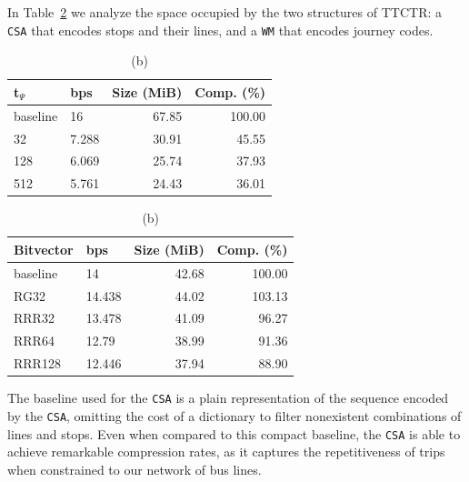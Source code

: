 \documentclass[runningheads]{llncs}
\newcommand{\ttctr}{TTCTR}
\begin{document}
In Table~\ref{tab:ttctr} we analyze the space occupied by the two structures of \ttctr: a \texttt{CSA} that encodes stops and their lines, and a \texttt{WM} that encodes journey codes. 

\begin{table}
    \caption{Space requirements for the \texttt{CSA} (a) and the \texttt{WM} (b) from \ttctr}
    \label{tab:ttctr}
    \begin{subtable}[t]{.48\linewidth}
    \vspace{-12pt}
    \caption{\footnotesize (a)}
    \vspace{-12pt}
    \begin{tabular}[t]{|l|l|r|r|}
        \hline
        t$_\Psi$ & bps & Size (MiB) & Comp. (\%) \\
         \hline
        baseline & 16 & 67.85 & 100.00 \\
        32 & 7.288 & 30.91 & 45.55 \\
        128 & 6.069 & 25.74 & 37.93 \\
        512 & 5.761 & 24.43 & 36.01 \\
        \hline
    \end{tabular}
    \end{subtable}%
    \begin{subtable}[t]{.48\linewidth}
    \vspace{-12pt}
    \caption{\footnotesize (b)}
    \vspace{-12pt}
    \begin{tabular}[t]{|l|l|r|r|}
        \hline
        Bitvector & bps & Size (MiB) & Comp. (\%) \\
         \hline
        baseline & 14 & 42.68 & 100.00 \\
        RG32 & 14.438 & 44.02 & 103.13 \\
        RRR32 & 13.478 & 41.09 & 96.27 \\
        RRR64 & 12.79 & 38.99 & 91.36 \\
        RRR128 & 12.446 & 37.94 & 88.90 \\
        \hline
    \end{tabular}
    \end{subtable}
\end{table}

The baseline used for the \texttt{CSA} is a plain representation of the sequence encoded by the \texttt{CSA}, omitting the cost of a dictionary to filter nonexistent combinations of lines and stops. Even when compared to this compact baseline, the \texttt{CSA} is able to achieve remarkable compression rates, as it captures the repetitiveness of trips when constrained to our network of bus lines.
\end{document}
